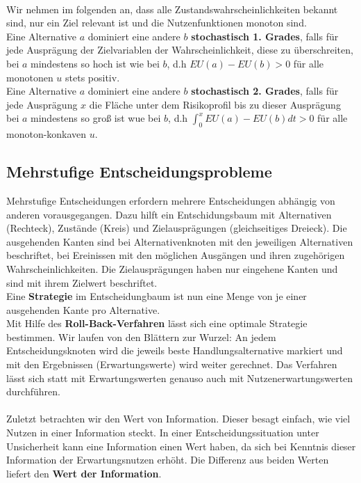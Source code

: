 \ \\
Wir nehmen im folgenden an, dass alle Zustandswahrscheinlichkeiten bekannt sind, nur ein Ziel relevant ist und die Nutzenfunktionen monoton sind.\\
Eine Alternative \(a\) dominiert eine andere \(b\) \textbf{stochastisch 1. Grades}, falls für jede Ausprägung der Zielvariablen der Wahrscheinlichkeit, diese zu überschreiten, bei \(a\) mindestens so hoch ist wie bei \(b\), d.h \(EU(a)-EU(b)>0\) für alle monotonen \(u\) stets positiv.\\
Eine Alternative \(a\) dominiert eine andere \(b\) \textbf{stochastisch 2. Grades}, falls für jede Ausprägung \(x\) die Fläche unter dem Risikoprofil bis zu dieser Ausprägung bei \(a\) mindestens so groß ist wue bei \(b\), d.h \(\int_0^x EU(a)-EU(b)dt > 0\) für alle monoton-konkaven \(u\).\\

\subsection{Mehrstufige Entscheidungsprobleme}
Mehrstufige Entscheidungen erfordern mehrere Entscheidungen abhängig von anderen vorausgegangen. Dazu hilft ein Entschidungsbaum mit Alternativen (Rechteck), Zustände (Kreis) und Zielausprägungen (gleichseitiges Dreieck). Die ausgehenden Kanten sind bei Alternativenknoten mit den jeweiligen Alternativen beschriftet, bei Ereinissen mit den möglichen Ausgängen und ihren zugehörigen Wahrscheinlichkeiten. Die Zielausprägungen haben nur eingehene Kanten und sind mit ihrem Zielwert beschriftet.\\
Eine \textbf{Strategie} im Entscheidungbaum ist nun eine Menge von je einer ausgehenden Kante pro Alternative.\\
Mit Hilfe des \textbf{Roll-Back-Verfahren} lässt sich eine optimale Strategie bestimmen. Wir laufen von den Blättern zur Wurzel: An jedem Entscheidungsknoten wird die jeweils beste Handlungsalternative markiert und mit den Ergebnissen (Erwartungswerte) wird weiter gerechnet.
Das Verfahren lässt sich statt mit Erwartungswerten genauso auch mit Nutzenerwartungswerten durchführen.\\
\ \\
Zuletzt betrachten wir den Wert von Information. Dieser besagt einfach, wie viel Nutzen in einer Information steckt. In einer Entscheidungssituation unter Unsicherheit kann eine Information einen Wert haben, da sich bei Kenntnis dieser Information der Erwartungsnutzen erhöht. Die Differenz aus beiden Werten liefert den \textbf{Wert der Information}.
